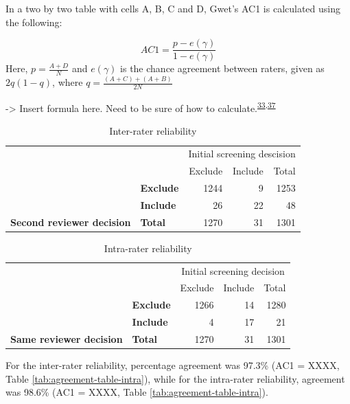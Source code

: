 \documentclass[a4paper, twoside]{templates/ociamthesis}
\begin{document}
In a two by two table with cells A, B, C and D, Gwet's AC1 is calculated using the following:

\[AC1 = \frac{p-e(\gamma)}{1-e(\gamma)}\]
Here, \(p = \frac{A+D}{N}\) and \(e(\gamma)\) is the chance agreement between raters, given as \(2q(1-q)\), where \(q = \frac{(A+C)+(A+B)}{2N}\)

-\textgreater{} Insert formula here. Need to be sure of how to calculate.\textsuperscript{\protect\hyperlink{ref-gwet2008}{33},\protect\hyperlink{ref-sim2005}{37}}

\begin{table}

\caption{\label{tab:agreementtableinter}Inter-rater reliability}
\centering
\begin{tabular}[t]{>{}l>{}lr>{}r|r}
\toprule
\multicolumn{2}{c}{ } & \multicolumn{3}{c}{Initial screening descision} \\
\cmidrule(l{3pt}r{3pt}){3-5}
 &  & Exclude & Include & Total\\
\midrule
 & \textbf{Exclude} & 1244 & 9 & 1253\\
\cmidrule{2-5}
 & \textbf{Include} & 26 & 22 & 48\\
\cmidrule{2-5}
\multirow{-3}{*}{\raggedright\arraybackslash \textbf{Second reviewer decision}} & \textbf{Total} & 1270 & 31 & 1301\\
\bottomrule
\end{tabular}
\end{table}

\begin{table}

\caption{\label{tab:agreementtableintra}Intra-rater reliability}
\centering
\begin{tabular}[t]{>{}l>{}l|r>{}r|r}
\toprule
\multicolumn{2}{c}{ } & \multicolumn{3}{c}{Initial screening decision} \\
\cmidrule(l{3pt}r{3pt}){3-5}
 &  & Exclude & Include & Total\\
\midrule
 & \textbf{Exclude} & 1266 & 14 & 1280\\
\cmidrule{2-5}
 & \textbf{Include} & 4 & 17 & 21\\
\cmidrule{2-5}
\multirow{-3}{*}{\raggedright\arraybackslash \textbf{Same reviewer decision}} & \textbf{Total} & 1270 & 31 & 1301\\
\bottomrule
\end{tabular}
\end{table}

For the inter-rater reliability, percentage agreement was 97.3\% (AC1 = XXXX, Table \ref{tab:agreement-table-intra}), while for the intra-rater reliability, agreement was 98.6\% (AC1 = XXXX, Table \ref{tab:agreement-table-intra}).
\end{document}
